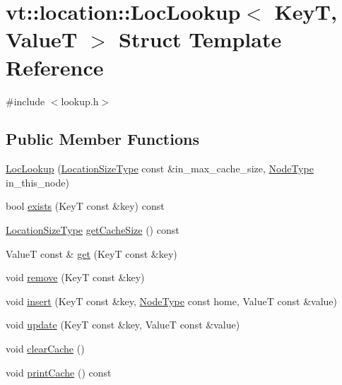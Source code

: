 \hypertarget{structvt_1_1location_1_1_loc_lookup}{}\section{vt\+:\+:location\+:\+:Loc\+Lookup$<$ KeyT, ValueT $>$ Struct Template Reference}
\label{structvt_1_1location_1_1_loc_lookup}


{\ttfamily \#include $<$lookup.\+h$>$}

\subsection*{Public Member Functions}
\begin{DoxyCompactItemize}
\item 
\hyperlink{structvt_1_1location_1_1_loc_lookup_a27e5f79af811503f9c0652b9f1be35b8}{Loc\+Lookup} (\hyperlink{namespacevt_1_1location_ab1c4c5849012a23eee2fbd1fce6159d7}{Location\+Size\+Type} const \&in\+\_\+max\+\_\+cache\+\_\+size, \hyperlink{namespacevt_a866da9d0efc19c0a1ce79e9e492f47e2}{Node\+Type} in\+\_\+this\+\_\+node)
\item 
bool \hyperlink{structvt_1_1location_1_1_loc_lookup_ad1c4809e9687c975335fee019cc3e39b}{exists} (KeyT const \&key) const
\item 
\hyperlink{namespacevt_1_1location_ab1c4c5849012a23eee2fbd1fce6159d7}{Location\+Size\+Type} \hyperlink{structvt_1_1location_1_1_loc_lookup_a95081b04f2cd212457ec56c579ba988b}{get\+Cache\+Size} () const
\item 
ValueT const  \& \hyperlink{structvt_1_1location_1_1_loc_lookup_a3be47c30312499b386c2d459b4b81c9f}{get} (KeyT const \&key)
\item 
void \hyperlink{structvt_1_1location_1_1_loc_lookup_a6c82de648f51e3242bd7430d185041fe}{remove} (KeyT const \&key)
\item 
void \hyperlink{structvt_1_1location_1_1_loc_lookup_a63ff201b384e4f65c02b3a99b8ba543e}{insert} (KeyT const \&key, \hyperlink{namespacevt_a866da9d0efc19c0a1ce79e9e492f47e2}{Node\+Type} const home, ValueT const \&value)
\item 
void \hyperlink{structvt_1_1location_1_1_loc_lookup_a95e6e8096c0d9c5a76727ebbf441995a}{update} (KeyT const \&key, ValueT const \&value)
\item 
void \hyperlink{structvt_1_1location_1_1_loc_lookup_aae2c3e418b59b36c0a53da17fe7fb3b8}{clear\+Cache} ()
\item 
void \hyperlink{structvt_1_1location_1_1_loc_lookup_a03bf48e7c5af3720c13e00ead13c83a0}{print\+Cache} () const
\end{DoxyCompactItemize}
